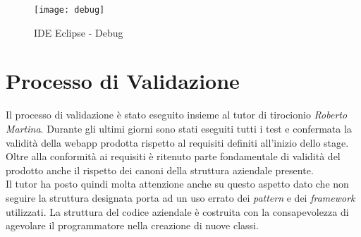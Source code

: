 \begin{figure}[H]
\bigskip
    \centering 
    \texttt{[image: debug]} 
    \bigskip
    \caption{IDE Eclipse - Debug}
\end{figure}
\bigskip
\bigskip
\section{Processo di Validazione}
Il processo di validazione è stato eseguito insieme al tutor di tirocionio \textit{Roberto Martina}. Durante gli ultimi giorni sono stati eseguiti tutti i test e confermata la validità della webapp prodotta rispetto al requisiti definiti all'inizio dello stage. \\
Oltre alla conformità ai requisiti è ritenuto parte fondamentale di validità del prodotto anche il rispetto dei canoni della struttura aziendale presente. \\
Il tutor ha posto quindi molta attenzione anche su questo aspetto dato che non seguire la struttura designata porta ad un uso errato dei \textit{pattern} e dei \textit{framework} utilizzati. La struttura del codice aziendale è costruita con la consapevolezza di agevolare il programmatore nella creazione di nuove classi.